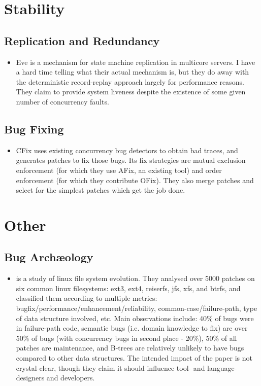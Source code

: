 \documentclass{article}
\begin{document}
\section{Stability}
\subsection{Replication and Redundancy}
\begin{itemize}
	\item Eve \cite{eve} is a mechanism for state machine replication in multicore servers. I have a hard time telling what their actual mechanism is, but they do away with the deterministic record-replay approach largely for performance reasons. They claim to provide system liveness despite the existence of some given number of concurrency faults.
\end{itemize}

\subsection{Bug Fixing}
\begin{itemize}
	\item CFix \cite{cfix} uses existing concurrency bug detectors to obtain bad traces, and generates patches to fix those bugs. Its fix strategies are mutual exclusion enforcement (for which they use AFix, an existing tool) and order enforcement (for which they contribute OFix). They also merge patches and select for the simplest patches which get the job done.
\end{itemize}


\section{Other}
\subsection{Bug Arch\ae{}ology}
\begin{itemize}
	\item \cite{evolution} is a study of linux file system evolution. They analysed over 5000 patches on six common linux filesystems: ext3, ext4, reiserfs, jfs, xfs, and btrfs, and classified them according to multiple metrics: bugfix/performance/enhancement/reliability, common-case/failure-path, type of data structure involved, etc.
		Main observations include: 40\% of bugs were in failure-path code, semantic bugs (i.e. domain knowledge to fix) are over 50\% of bugs (with concurrency bugs in second place - 20\%), 50\% of all patches are maintenance, and B-trees are relatively unlikely to have bugs compared to other data structures.
		The intended impact of the paper is not crystal-clear, though they claim it should influence tool- and language-designers and developers.
\end{itemize}
\end{document}

